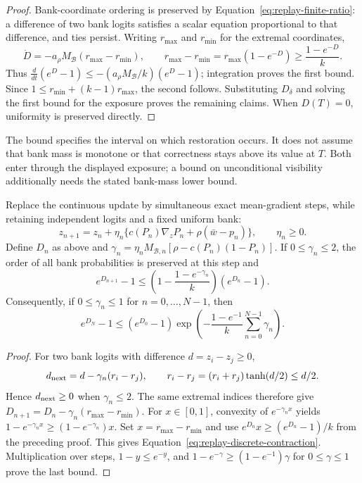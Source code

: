 \begin{proof}
Bank-coordinate ordering is preserved by
Equation~\eqref{eq:replay-finite-ratio}: a difference of two bank logits
satisfies a scalar equation proportional to that difference, and ties persist.
Writing $r_{\max}$ and $r_{\min}$ for the extremal coordinates,
\[
 \dot D=-a_\rho M_{\mathcal B}(r_{\max}-r_{\min}),
 \qquad
 r_{\max}-r_{\min}
   =r_{\max}(1-e^{-D})\ge\frac{1-e^{-D}}{k}.
\]
Thus $\frac{d}{dt}(e^D-1)\le
 -(a_\rho M_{\mathcal B}/k)(e^D-1)$; integration proves the first bound.
Since $1\le r_{\min}+(k-1)r_{\max}$, the second follows. Substituting
$D_\delta$ and solving the first bound for the exposure proves the remaining
claims. When $D(T)=0$, uniformity is preserved directly.
\end{proof}

The bound specifies the interval on which restoration occurs. It does not
assume that bank mass is monotone or that correctness stays above its value
at $T$. Both enter through the displayed exposure; a bound on unconditional
visibility additionally needs the stated bank-mass lower bound.

\begin{proposition}
\label{prop:replay-discrete-contraction}
Replace the continuous update by simultaneous exact mean-gradient steps,
while retaining independent logits and a fixed uniform bank:
\[
 z_{n+1}=z_n+\eta_n\{c(P_n)\nabla_zP_n+
                         \rho(\bar w-p_n)\},\qquad \eta_n\ge0.
\]
Define $D_n$ as above and
$\gamma_n=\eta_n M_{\mathcal B,n}
 [\rho-c(P_n)(1-P_n)]$.
If $0\le\gamma_n\le2$, the order of all bank probabilities is preserved
at this step and
\begin{equation}
 e^{D_{n+1}}-1\le
 \left(1-\frac{1-e^{-\gamma_n}}{k}\right)(e^{D_n}-1).
 \label{eq:replay-discrete-contraction}
\end{equation}
Consequently, if $0\le\gamma_n\le1$ for $n=0,\ldots,N-1$, then
\[
 e^{D_N}-1\le(e^{D_0}-1)
  \exp\!\left(-\frac{1-e^{-1}}{k}
                    \sum_{n=0}^{N-1}\gamma_n\right).
\]
\end{proposition}

\begin{proof}
For two bank logits with difference $d=z_i-z_j\ge0$,
\[
 d_{\rm next}=d-\gamma_n(r_i-r_j),\qquad
 r_i-r_j=(r_i+r_j)\tanh(d/2)\le d/2.
\]
Hence $d_{\rm next}\ge0$ when $\gamma_n\le2$. The same extremal indices
therefore give
$D_{n+1}=D_n-\gamma_n(r_{\max}-r_{\min})$.
For $x\in[0,1]$, convexity of $e^{-\gamma_nx}$ yields
$1-e^{-\gamma_nx}\ge(1-e^{-\gamma_n})x$. Set
$x=r_{\max}-r_{\min}$ and use
$e^{D_n}x\ge(e^{D_n}-1)/k$ from the preceding proof. This gives
Equation~\eqref{eq:replay-discrete-contraction}. Multiplication over steps,
$1-y\le e^{-y}$, and
$1-e^{-\gamma}\ge(1-e^{-1})\gamma$ for $0\le\gamma\le1$ prove the last
bound.
\end{proof}

